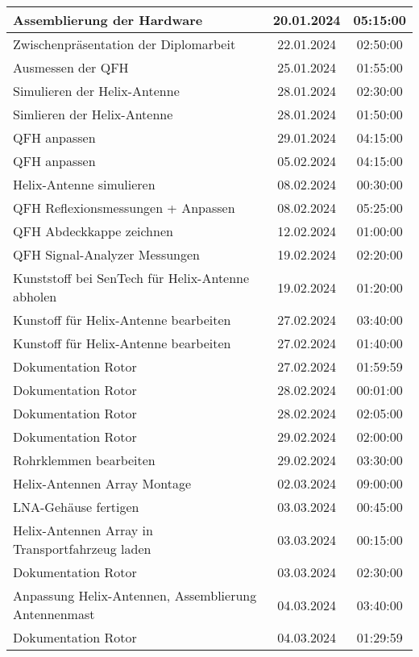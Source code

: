 \begin{longtable}{|l|c|c|}
	\hline
	Assemblierung der Hardware & 20.01.2024 & 05:15:00 \\
	\hline
	Zwischenpräsentation der Diplomarbeit & 22.01.2024 & 02:50:00 \\
	\hline
	Ausmessen der QFH & 25.01.2024 & 01:55:00 \\
	\hline
	Simulieren der Helix-Antenne & 28.01.2024 & 02:30:00 \\
	\hline
	Simlieren der Helix-Antenne & 28.01.2024 & 01:50:00 \\
	\hline
	QFH anpassen & 29.01.2024 & 04:15:00 \\
	\hline
	QFH anpassen & 05.02.2024 & 04:15:00 \\
	\hline
	Helix-Antenne simulieren & 08.02.2024 & 00:30:00 \\
	\hline
	QFH Reflexionsmessungen + Anpassen & 08.02.2024 & 05:25:00 \\
	\hline
	QFH Abdeckkappe zeichnen & 12.02.2024 & 01:00:00 \\
	\hline
	QFH Signal-Analyzer Messungen & 19.02.2024 & 02:20:00 \\
	\hline
	Kunststoff bei SenTech für Helix-Antenne abholen & 19.02.2024 & 01:20:00 \\
	\hline
	Kunstoff für Helix-Antenne bearbeiten & 27.02.2024 & 03:40:00 \\
	\hline
	Kunstoff für Helix-Antenne bearbeiten & 27.02.2024 & 01:40:00 \\
	\hline
	Dokumentation Rotor & 27.02.2024 & 01:59:59 \\
	\hline
	Dokumentation Rotor & 28.02.2024 & 00:01:00 \\
	\hline
	Dokumentation Rotor  & 28.02.2024 & 02:05:00 \\
	\hline
	Dokumentation Rotor & 29.02.2024 & 02:00:00 \\
	\hline
	Rohrklemmen bearbeiten & 29.02.2024 & 03:30:00 \\
	\hline
	Helix-Antennen Array Montage & 02.03.2024 & 09:00:00 \\
	\hline
	LNA-Gehäuse fertigen & 03.03.2024 & 00:45:00 \\
	\hline
	Helix-Antennen Array  in Transportfahrzeug laden & 03.03.2024 & 00:15:00 \\
	\hline
	Dokumentation Rotor & 03.03.2024 & 02:30:00 \\
	\hline
	Anpassung Helix-Antennen, Assemblierung Antennenmast & 04.03.2024 & 03:40:00 \\
	\hline
	Dokumentation Rotor & 04.03.2024 & 01:29:59 \\

\end{longtable}
